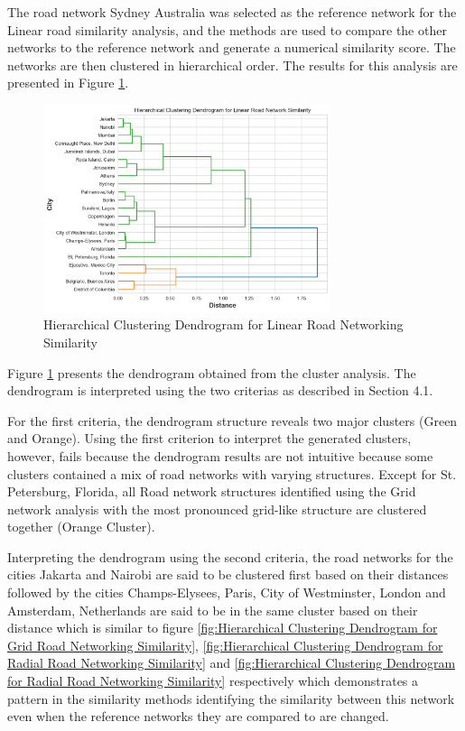  The road network Sydney Australia was selected as the reference network for the Linear road similarity analysis, and the methods are used to compare the other networks to the reference network and generate a numerical similarity score. The networks are then clustered in hierarchical order. The results for this analysis are presented in Figure \ref{fig:Hierarchical Clustering Dendrogram for Linear Road Networking Similarity}.

\begin{figure}[!ht]
\centering
\includegraphics[width=0.75\textwidth,center]{picture/Linear/linear_dendrogram2.png}
\caption[Hierarchical Clustering Dendrogram for Linear Road Networking Similarity]{Hierarchical Clustering Dendrogram for Linear Road Networking Similarity}
\label{fig:Hierarchical Clustering Dendrogram for Linear Road Networking Similarity}
\end{figure}

Figure \ref{fig:Hierarchical Clustering Dendrogram for Linear Road Networking Similarity} presents the dendrogram obtained from the cluster analysis. The dendrogram is interpreted using the two criterias as described in Section 4.1.

For the first criteria, the dendrogram structure reveals two major clusters (Green and Orange). Using the first criterion to interpret the generated clusters, however, fails because the dendrogram results are not intuitive because some clusters contained a mix of road networks with varying structures. Except for St. Petersburg, Florida, all Road network structures identified using the Grid network analysis with the most pronounced grid-like structure are clustered together (Orange Cluster).

Interpreting the dendrogram using the second criteria, the road networks for the cities Jakarta and Nairobi are said to be clustered first based on their distances followed by the cities Champs-Elysees, Paris, City of Westminster, London  and Amsterdam, Netherlands are said to be in the same cluster based on their distance which is similar to figure \ref{fig:Hierarchical Clustering Dendrogram for Grid Road Networking Similarity}, \ref{fig:Hierarchical Clustering Dendrogram for Radial Road Networking Similarity} and \ref{fig:Hierarchical Clustering Dendrogram for Radial Road Networking Similarity} respectively which demonstrates a pattern in the similarity methods identifying the similarity between this network even when the reference networks they are compared to are changed.

